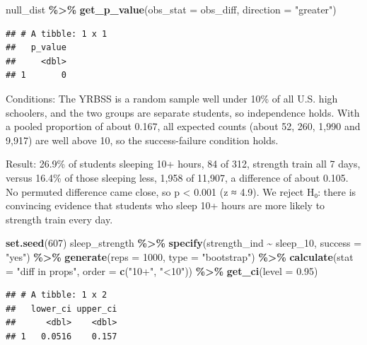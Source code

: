 \documentclass[
]{article}
\newenvironment{Shaded}{\begin{snugshade}}{\end{snugshade}}
\newcommand{\AttributeTok}[1]{\textcolor[rgb]{0.13,0.29,0.53}{#1}}
\newcommand{\DecValTok}[1]{\textcolor[rgb]{0.00,0.00,0.81}{#1}}
\newcommand{\FloatTok}[1]{\textcolor[rgb]{0.00,0.00,0.81}{#1}}
\newcommand{\FunctionTok}[1]{\textcolor[rgb]{0.13,0.29,0.53}{\textbf{#1}}}
\newcommand{\NormalTok}[1]{#1}
\newcommand{\SpecialCharTok}[1]{\textcolor[rgb]{0.81,0.36,0.00}{\textbf{#1}}}
\newcommand{\StringTok}[1]{\textcolor[rgb]{0.31,0.60,0.02}{#1}}
\begin{document}
\begin{Shaded}
\begin{Highlighting}[]
\NormalTok{null\_dist }\SpecialCharTok{\%\textgreater{}\%} \FunctionTok{get\_p\_value}\NormalTok{(}\AttributeTok{obs\_stat =}\NormalTok{ obs\_diff, }\AttributeTok{direction =} \StringTok{"greater"}\NormalTok{)}
\end{Highlighting}
\end{Shaded}

\begin{verbatim}
## # A tibble: 1 x 1
##   p_value
##     <dbl>
## 1       0
\end{verbatim}

Conditions: The YRBSS is a random sample well under 10\% of all U.S.
high schoolers, and the two groups are separate students, so
independence holds. With a pooled proportion of about 0.167, all
expected counts (about 52, 260, 1,990 and 9,917) are well above 10, so
the success-failure condition holds.

Result: 26.9\% of students sleeping 10+ hours, 84 of 312, strength train
all 7 days, versus 16.4\% of those sleeping less, 1,958 of 11,907, a
difference of about 0.105. No permuted difference came close, so p
\textless{} 0.001 (z ≈ 4.9). We reject H₀: there is convincing evidence
that students who sleep 10+ hours are more likely to strength train
every day.

\begin{Shaded}
\begin{Highlighting}[]
\FunctionTok{set.seed}\NormalTok{(}\DecValTok{607}\NormalTok{)}
\NormalTok{sleep\_strength }\SpecialCharTok{\%\textgreater{}\%}
  \FunctionTok{specify}\NormalTok{(strength\_ind }\SpecialCharTok{\textasciitilde{}}\NormalTok{ sleep\_10, }\AttributeTok{success =} \StringTok{"yes"}\NormalTok{) }\SpecialCharTok{\%\textgreater{}\%}
  \FunctionTok{generate}\NormalTok{(}\AttributeTok{reps =} \DecValTok{1000}\NormalTok{, }\AttributeTok{type =} \StringTok{"bootstrap"}\NormalTok{) }\SpecialCharTok{\%\textgreater{}\%}
  \FunctionTok{calculate}\NormalTok{(}\AttributeTok{stat =} \StringTok{"diff in props"}\NormalTok{, }\AttributeTok{order =} \FunctionTok{c}\NormalTok{(}\StringTok{"10+"}\NormalTok{, }\StringTok{"\textless{}10"}\NormalTok{)) }\SpecialCharTok{\%\textgreater{}\%}
  \FunctionTok{get\_ci}\NormalTok{(}\AttributeTok{level =} \FloatTok{0.95}\NormalTok{)}
\end{Highlighting}
\end{Shaded}

\begin{verbatim}
## # A tibble: 1 x 2
##   lower_ci upper_ci
##      <dbl>    <dbl>
## 1   0.0516    0.157
\end{verbatim}
\end{document}
